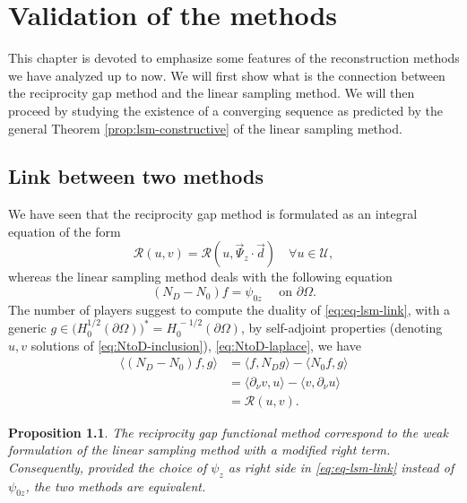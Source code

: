 \documentclass[10pt, a4paper, twoside, openright]{book}
\theoremstyle{definition}
\theoremstyle{plain}
\theoremstyle{plain}
\theoremstyle{plain}
\newtheorem{proposition}[subsection]{Proposition}
\theoremstyle{plain}
\theoremstyle{plain}
\theoremstyle{plain}
\theoremstyle{plain}
\theoremstyle{plain}
\begin{document}
\chapter{Validation of the methods}
\label{ch:link}
This chapter is devoted to emphasize some features of the reconstruction methods we have analyzed 
up to now. We will first show what is the connection between the reciprocity gap method and the linear 
sampling method. We will then proceed by studying the existence of a converging sequence as predicted 
by the general Theorem \ref{prop:lsm-constructive} of the linear sampling method.
\section{Link between two methods}
We have seen that the reciprocity gap method is formulated as an integral equation 
of the form
\begin{equation}
 \mathcal{R}(u, v) = \mathcal{R}(u, \vec{\Psi}_z\cdot\vec{d})\quad \forall u \in \mathcal{U},
\end{equation}
whereas the linear sampling method deals with the following equation
\begin{equation}
\label{eq:eq-lsm-link}
 ({N_D} - {N_0})f = \psi_{0z} \quad \text{ on }\partial \Omega.
\end{equation}
The number of players suggest to compute the duality of \eqref{eq:eq-lsm-link}, with a generic 
${g \in \bigl(H^{1/2}_0(\partial \Omega)\bigr)^* = H^{\,-1/2}_0(\partial \Omega)}$, by self-adjoint properties (denoting $u,v$ solutions of 
\eqref{eq:NtoD-inclusion}), \eqref{eq:NtoD-laplace}, we have
\begin{align}
 \label{eq:link-duality-left}
 \langle({N_D} - {N_0})f,g\rangle & =  \langle f,{N_D} g\rangle - \langle {N_0} f,g\rangle \\
                                        & = \langle \partial_\nu v,u\rangle - \langle v,\partial_\nu u\rangle \\
                                        & = \mathcal{R}(u,v).
\end{align}
\begin{proposition}
 The \textit{reciprocity gap functional method} correspond to the weak formulation of the \textit{linear sampling method} with a modified right term. Consequently, provided the choice of $\psi_z$ as right side in \eqref{eq:eq-lsm-link}
 instead of $\psi_{0z}$, the two methods are equivalent.
\end{proposition}
\end{document}
